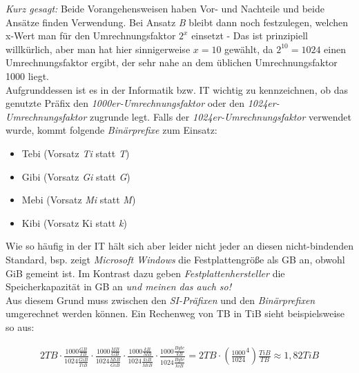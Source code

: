 \documentclass[a4paper, 12pt]{report}
\begin{document}
\emph{Kurz gesagt:}  Beide Vorangehensweisen haben Vor- und Nachteile und beide
Ansätze finden Verwendung. Bei Ansatz \emph{B} bleibt dann noch festzulegen,
welchen x-Wert man für den Umrechnungsfaktor $2^x$ einsetzt - Das ist
prinzipiell willkürlich, aber man hat hier sinnigerweise $x = 10$ gewählt, da
$2^10 = 1024$ einen Umrechnungsfaktor ergibt, der sehr nahe an dem üblichen
Umrechnungsfaktor 1000 liegt. \\

Aufgrunddessen ist es in der Informatik bzw. IT wichtig zu kennzeichnen, ob
das genutzte Präfix den \emph{1000er-Umrechnungsfaktor} oder den
\emph{1024er-Umrechnungsfaktor} zugrunde legt. Falls der
\emph{1024er-Umrechnungsfaktor} verwendet wurde, kommt folgende
\emph{Binärprefixe} zum Einsatz:

\begin{itemize}
    \item Tebi (Vorsatz \emph{Ti} statt \emph{T})
    \item Gibi (Vorsatz \emph{Gi} statt \emph{G})
    \item Mebi (Vorsatz \emph{Mi} statt \emph{M})
    \item Kibi (Vorsatz {Ki} statt \emph{k})
\end{itemize}

Wie so häufig in der IT hält sich aber leider nicht jeder an diesen
nicht-bindenden Standard, bsp. zeigt \emph{Microsoft Windows} die
Festplattengröße als GB an, obwohl GiB gemeint ist. Im Kontrast dazu geben
\emph{Festplattenhersteller} die Speicherkapazität in GB an \emph{und meinen
das auch so!} \\

Aus diesem Grund muss zwischen den \emph{SI-Präfixen} und den
\emph{Binärprefixen} umgerechnet werden können. Ein Rechenweg von TB in
TiB sieht beispielsweise so aus:

\begin{center}
    \begin{equation}
	\begin{split}
	    2TB \cdot \frac{1000 \frac{GB}{TB}}{1024 \frac{GiB}{TiB}}
	    \cdot \frac{1000 \frac{MB}{GB}}{1024 \frac{MiB}{GiB}}
	    \cdot \frac{1000 \frac{kB}{MB}}{1024 \frac{kiB}{MiB}}
	    \cdot \frac{1000 \frac{Byte}{kB}}{1024 \frac{Byte}{kiB}}
	    = 2TB \cdot \left( \frac{1000}{1024}^4 \right) \frac{TiB}{TB}
	    \approx 1,82 TiB
	\end{split}
    \end{equation}
\end{center}
\end{document}
